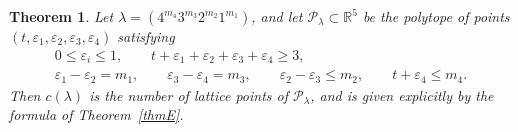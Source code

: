 \documentclass[reqno]{amsart}
\theoremstyle{plain}
\newtheorem{theorem}{Theorem}[section]
\theoremstyle{definition}
\theoremstyle{remark}
\theoremstyle{plain}
\begin{document}
\begin{theorem}\label{thm-four-columns}
Let $\lambda=(4^{m_4}3^{m_3}2^{m_2}1^{m_1})$, and let
$\mathcal P_\lambda\subset\mathbb{R}^5$ be the polytope of points
$(t,\varepsilon_1,\varepsilon_2,\varepsilon_3,\varepsilon_4)$ satisfying
\begin{gather*}
0\le\varepsilon_i\le1,\qquad t+\varepsilon_1+\varepsilon_2+\varepsilon_3+\varepsilon_4\ge3,\\[4pt]
\varepsilon_1-\varepsilon_2=m_1,\qquad \varepsilon_3-\varepsilon_4=m_3,\qquad
\varepsilon_2-\varepsilon_3\le m_2,\qquad t+\varepsilon_4\le m_4.
\end{gather*}
Then $c(\lambda)$ is the number of lattice points of $\mathcal P_\lambda$, and is
given explicitly by the formula of Theorem~\ref{thmE}.
\end{theorem}
\end{document}
